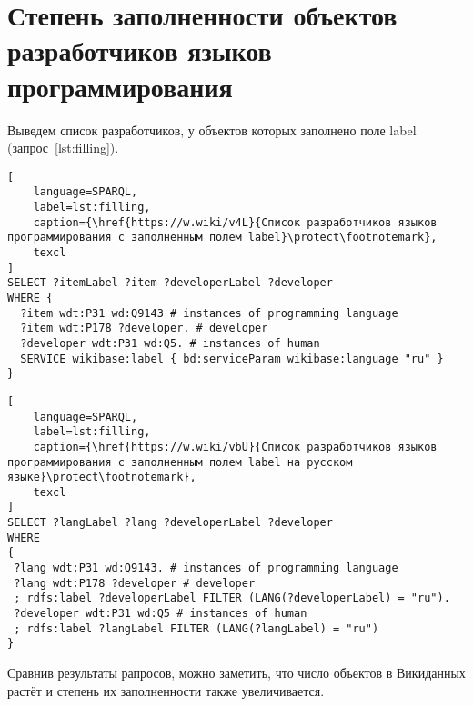 \newpage
\section{Степень заполненности объектов разработчиков языков программирования}
Выведем список разработчиков, у объектов которых заполнено поле label (запрос~\ref{lst:filling}).

\begin{lstlisting}[
	language=SPARQL,
	label=lst:filling,
	caption={\href{https://w.wiki/v4L}{Список разработчиков языков программирования с заполненным полем label}\protect\footnotemark},
	texcl
]
SELECT ?itemLabel ?item ?developerLabel ?developer
WHERE {
  ?item wdt:P31 wd:Q9143 # instances of programming language
  ?item wdt:P178 ?developer. # developer 
  ?developer wdt:P31 wd:Q5. # instances of human
  SERVICE wikibase:label { bd:serviceParam wikibase:language "ru" }
}
\end{lstlisting}

\begin{lstlisting}[
	language=SPARQL,
	label=lst:filling,
	caption={\href{https://w.wiki/vbU}{Список разработчиков языков программирования с заполненным полем label на русском языке}\protect\footnotemark},
	texcl
]
SELECT ?langLabel ?lang ?developerLabel ?developer
WHERE
{
 ?lang wdt:P31 wd:Q9143. # instances of programming language
 ?lang wdt:P178 ?developer # developer 
 ; rdfs:label ?developerLabel FILTER (LANG(?developerLabel) = "ru").
 ?developer wdt:P31 wd:Q5 # instances of human
 ; rdfs:label ?langLabel FILTER (LANG(?langLabel) = "ru")
}
\end{lstlisting}

Сравнив результаты рапросов, можно заметить, что число объектов в Викиданных растёт и степень их заполненности также увеличивается.

